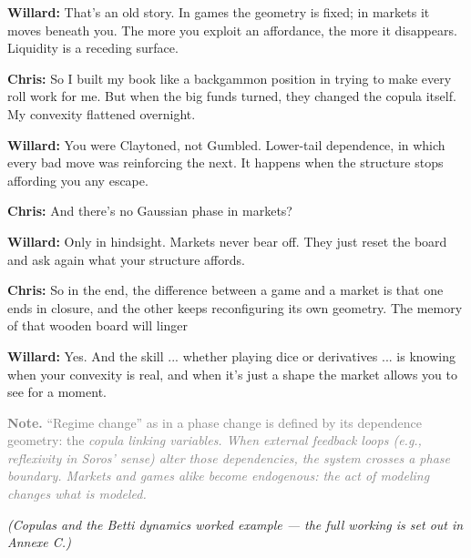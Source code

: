 \textbf{Willard:}  
That’s an old story.   In games the geometry is fixed;  in markets it moves beneath you.   The more you exploit an affordance, the more it disappears.  Liquidity is a receding surface.

\textbf{Chris:}  
So I built my book like a backgammon position in trying to make every roll work for me.   But when the big funds turned,  
they changed the copula itself.   My convexity flattened overnight.

\textbf{Willard:}  
You were Claytoned, not Gumbled.  
Lower-tail dependence, in which every bad move was reinforcing the next.  It happens when the structure stops affording you any escape.

\textbf{Chris:}  
And there’s no Gaussian phase in markets?

\textbf{Willard:}  
Only in hindsight.  
Markets never bear off.  
They just reset the board and ask again what your structure affords.

\textbf{Chris:}  
So in the end, the difference between a game and a market   is that one ends in closure,  and the other keeps reconfiguring its own geometry. The memory of that wooden board will linger

\textbf{Willard:}  
Yes.  And the skill ... whether playing dice or derivatives ... is knowing when your convexity is real,  and when it’s just a shape the market allows you to see for a moment.

\noindent\footnotesize{\textcolor{gray}{%
\textbf{Note.} ``Regime change'' as in a phase change is defined by its dependence geometry: the \em{copula} linking variables.  When external feedback loops (e.g., reflexivity in Soros’ sense) alter those dependencies, the system crosses a phase boundary.  Markets and games alike become \textit{endogenous}: the act of modeling changes what is modeled.}}

\textit{(Copulas and the Betti dynamics worked example --- the full working is set out in Annexe C.)}


